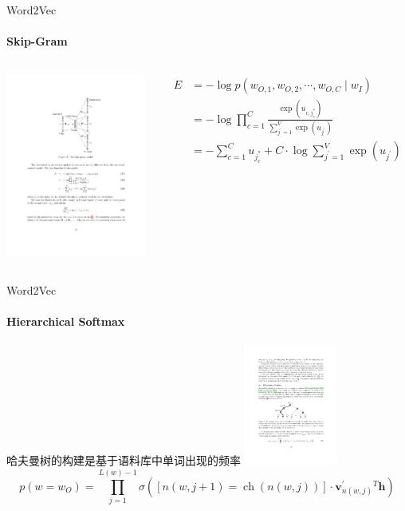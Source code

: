\documentclass{beamer}
\begin{document}
\begin{frame}{Word2Vec}
    \framesubtitle{Skip-Gram}
    \begin{columns}
        \begin{column}{0.4\textwidth}
            \centering\includegraphics[height=6cm]{word2vec_3.pdf}
        \end{column}
        \begin{column}{0.6\textwidth}
            $$
            \begin{aligned}
            E &=-\log p\left(w_{O, 1}, w_{O, 2}, \cdots, w_{O, C} \mid w_{I}\right) \\
            &=-\log \prod_{c=1}^{C} \frac{\exp \left(u_{c, j_{c}^{*}}\right)}{\sum_{j^{\prime}=1}^{V} \exp \left(u_{j^{\prime}}\right)} \\
            &=-\sum_{c=1}^{C} u_{j_{c}^{*}}+C \cdot \log \sum_{j^{\prime}=1}^{V} \exp \left(u_{j^{\prime}}\right)
            \end{aligned}
            $$
        \end{column}
    \end{columns}
\end{frame}
\begin{frame}{Word2Vec}
    \framesubtitle{Hierarchical Softmax}
    哈夫曼树的构建是基于语料库中单词出现的频率
    \centering\includegraphics[height=4cm]{word2vec_4.pdf}
    $$
        p\left(w=w_{O}\right)=\prod_{j=1}^{L(w)-1} \sigma\left([ n(w, j+1)=\operatorname{ch}(n(w, j)) ] \cdot \mathbf{v}_{n(w, j)}^{\prime}{ }^{T} \mathbf{h}\right)
    $$
\end{frame}
\end{document}
